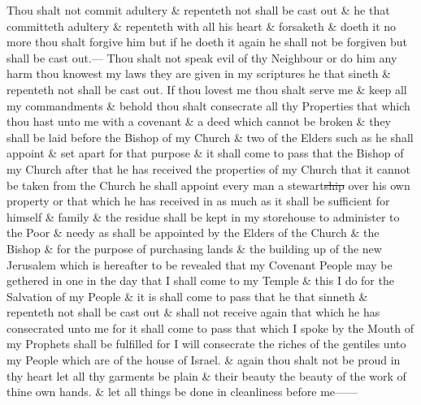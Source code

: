 			Thou shalt not commit adultery \& repenteth not shall be cast out \& he that committeth adultery \& repenteth with all his heart \& forsaketh \& doeth it no more thou shalt forgive him but if he doeth it again he shall not be forgiven but shall be cast out.--- Thou shalt not speak evil of thy Neighbour or do him any harm thou knowest my laws they are given in my scriptures he that sineth \& repenteth not shall be cast out. If thou lovest me thou shalt serve me \& keep all my commandments \& behold thou shalt consecrate all thy Properties that which thou hast unto me with a covenant \& a deed which cannot be broken \& they shall be laid before the Bishop of my Church \& two of the Elders such as he shall appoint \& set apart for that purpose \& it shall come to pass that the Bishop of my Church after that he has received the properties of my Church that it cannot be taken from the Church he shall appoint every man a stewart\sout{ship} over his own property or that which he has received in as much as it shall be sufficient for himself \& family \& the residue shall be kept in my storehouse to administer to the Poor \& needy as shall be appointed by the Elders of the Church \& the Bishop \& for the purpose of purchasing lands \& the building up of the new Jerusalem which is hereafter to be revealed that my Covenant People may be gethered in one in the day that I shall come to my Temple \& this I do for the Salvation of my People \& it is shall come to pass that he that sinneth \& repenteth not shall be cast out \& shall not receive again that which he has consecrated unto me for it shall come to pass that which I spoke by the Mouth of my Prophets shall be fulfilled for I will consecrate the riches of the gentiles unto my People which are of the house of Israel. \& again thou shalt not be proud in thy heart let all thy garments be plain \& their beauty the beauty of the work of thine own hands. \& let all things be done in cleanliness before me------

